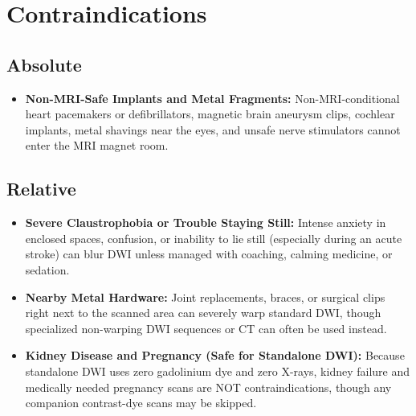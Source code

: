 \section{Contraindications}

\subsection{Absolute}
\begin{itemize}
\item \textbf{Non-MRI-Safe Implants and Metal Fragments:} Non-MRI-conditional heart pacemakers or defibrillators, magnetic brain aneurysm clips, cochlear implants, metal shavings near the eyes, and unsafe nerve stimulators cannot enter the MRI magnet room.
\end{itemize}

\subsection{Relative}
\begin{itemize}
\item \textbf{Severe Claustrophobia or Trouble Staying Still:} Intense anxiety in enclosed spaces, confusion, or inability to lie still (especially during an acute stroke) can blur DWI unless managed with coaching, calming medicine, or sedation.
\item \textbf{Nearby Metal Hardware:} Joint replacements, braces, or surgical clips right next to the scanned area can severely warp standard DWI, though specialized non-warping DWI sequences or CT can often be used instead.
\item \textbf{Kidney Disease and Pregnancy (Safe for Standalone DWI):} Because standalone DWI uses zero gadolinium dye and zero X-rays, kidney failure and medically needed pregnancy scans are NOT contraindications, though any companion contrast-dye scans may be skipped.
\end{itemize}

